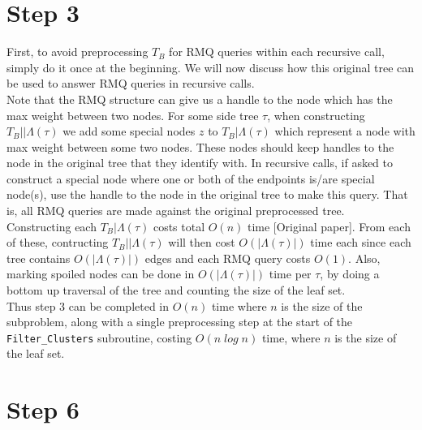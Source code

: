 \documentclass{article}
\begin{document}
    \section{Step 3}

    First, to avoid preprocessing $T_B$ for RMQ queries within each recursive call, simply do it once at the beginning. We will now discuss how this original tree can be used to answer RMQ queries in recursive calls.\\

    Note that the RMQ structure can give us a handle to the node which has the max weight between two nodes. For some side tree $\tau$, when constructing $T_B||\Lambda(\tau)$ we add some special nodes $z$ to $T_B|\Lambda(\tau)$ which represent a node with max weight between some two nodes. These nodes should keep handles to the node in the original tree that they identify with. In recursive calls, if asked to construct a special node where one or both of the endpoints is/are special node(s), use the handle to the node in the original tree to make this query. That is, all RMQ queries are made against the original preprocessed tree.\\

    Constructing each $T_B|\Lambda(\tau)$ costs total $O(n)$ time [Original paper]. From each of these, contructing $T_B||\Lambda(\tau)$ will then cost $O(|\Lambda(\tau)|)$ time each since each tree contains $O(|\Lambda(\tau)|)$ edges and each RMQ query costs $O(1)$. Also, marking spoiled nodes can be done in $O(|\Lambda(\tau)|)$ time per $\tau$, by doing a bottom up traversal of the tree and counting the size of the leaf set.\\

    Thus step 3 can be completed in $O(n)$ time where $n$ is the size of the subproblem, along with a single preprocessing step at the start of the \texttt{Filter\_Clusters} subroutine, costing $O(n\;log\;n)$ time, where $n$ is the size of the leaf set.

    \section{Step 6}
\end{document}
